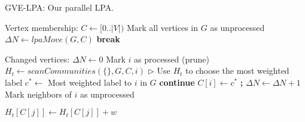 \begin{algorithm}[hbtp]
\caption{GVE-LPA: Our parallel LPA.}
\label{alg:rak}
\begin{algorithmic}[1]

\Statex

 \label{alg:rak--main-begin}
  \State Vertex membership: $C \gets [0 .. |V|)$ \label{alg:rak--init-begin}
  \State Mark all vertices in $G$ as unprocessed \label{alg:rak--init-end}
  \ForAll{$l_i \in [0 .. \text{\small{MAX\_ITERATIONS}})$} \label{alg:rak--iters-begin}
    \State $\Delta N \gets lpaMove(G, C)$ \label{alg:rak--propagate}
     \textbf{break}  \label{alg:rak--converged}
    \EndIf
  \EndFor \label{alg:rak--iters-end}
   \label{alg:rak--main-return}
\EndFunction \label{alg:rak--main-end}

\Statex

 \label{alg:rak--move-begin}
  \State Changed vertices: $\Delta N \gets 0$
    \State Mark $i$ as processed (prune) \label{alg:rak--prune}
    \State $H_t \gets scanCommunities(\{\}, G, C, i)$ \label{alg:rak--scan}
    \State $\rhd$ Use $H_t$ to choose the most weighted label
    \State $c^* \gets$ Most weighted label to $i$ in $G$ \label{alg:rak--best-community}
     \textbf{continue} \label{alg:rak--best-community-same}
    \EndIf
    \State $C[i] \gets c^*$ \textbf{;} $\Delta N \gets \Delta N + 1$ \label{alg:rak--perform-move}
    \State Mark neighbors of $i$ as unprocessed \label{alg:rak--remark}
  \EndFor
{} \label{alg:rak--move-return}
\EndFunction \label{alg:rak--move-end}

\Statex

 \label{alg:rak--scan-begin}
     $H_t[C[j]] \gets H_t[C[j]] + w$
    \EndIf
  \EndFor
\EndFunction \label{alg:rak--scan-end}
\end{algorithmic}
\end{algorithm}
